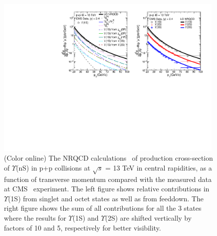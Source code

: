 \begin{figure}
  \centering
  \includegraphics[width=0.99\textwidth]{Figures/Fig3_CMS_YnS_Rap12_13TeV_Pt.pdf}
  \caption{\small{(Color online) The NRQCD calculations~\cite{Kumar:2021sek} of production cross-section of $\Upsilon$(nS)
      in p+p collisions at $\sqrt{s}$ = 13 TeV in central rapidities, as a function of
      transverse momentum compared with the measured data at CMS~\cite{CMS:2017dju}
      experiment. The left figure shows relative contributions in $\Upsilon$(1S) from
      singlet and octet states as well as from feeddown. The right figure shows the sum
      of all contributions for all the 3 states where the results for $\Upsilon$(1S) and
      $\Upsilon$(2S) are shifted vertically by factors of 10 and 5, respectively
      for better visibility. } }
  \label{Fig:SigmaYnSCMS13TeV}
\end{figure}




